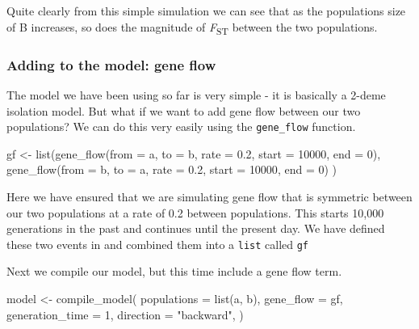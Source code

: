 \documentclass[
  letterpaper,
  DIV=11,
  numbers=noendperiod]{scrartcl}
\newenvironment{Shaded}{\begin{snugshade}}{\end{snugshade}}
\newcommand{\AttributeTok}[1]{\textcolor[rgb]{0.40,0.45,0.13}{#1}}
\newcommand{\DecValTok}[1]{\textcolor[rgb]{0.68,0.00,0.00}{#1}}
\newcommand{\FloatTok}[1]{\textcolor[rgb]{0.68,0.00,0.00}{#1}}
\newcommand{\FunctionTok}[1]{\textcolor[rgb]{0.28,0.35,0.67}{#1}}
\newcommand{\NormalTok}[1]{\textcolor[rgb]{0.00,0.23,0.31}{#1}}
\newcommand{\OtherTok}[1]{\textcolor[rgb]{0.00,0.23,0.31}{#1}}
\newcommand{\StringTok}[1]{\textcolor[rgb]{0.13,0.47,0.30}{#1}}
\begin{document}
Quite clearly from this simple simulation we can see that as the
populations size of B increases, so does the magnitude of
\emph{F}\textsubscript{ST} between the two populations.

\hypertarget{adding-to-the-model-gene-flow}{%
\subsubsection{Adding to the model: gene
flow}\label{adding-to-the-model-gene-flow}}

The model we have been using so far is very simple - it is basically a
2-deme isolation model. But what if we want to add gene flow between our
two populations? We can do this very easily using the
\texttt{gene\_flow} function.

\begin{Shaded}
\begin{Highlighting}[]
\NormalTok{gf }\OtherTok{\textless{}{-}}
  \FunctionTok{list}\NormalTok{(}\FunctionTok{gene\_flow}\NormalTok{(}\AttributeTok{from =}\NormalTok{ a, }\AttributeTok{to =}\NormalTok{ b, }\AttributeTok{rate =} \FloatTok{0.2}\NormalTok{, }\AttributeTok{start =} \DecValTok{10000}\NormalTok{, }\AttributeTok{end =} \DecValTok{0}\NormalTok{),}
       \FunctionTok{gene\_flow}\NormalTok{(}\AttributeTok{from =}\NormalTok{ b, }\AttributeTok{to =}\NormalTok{ a, }\AttributeTok{rate =} \FloatTok{0.2}\NormalTok{, }\AttributeTok{start =} \DecValTok{10000}\NormalTok{, }\AttributeTok{end =} \DecValTok{0}\NormalTok{)}
\NormalTok{  )}
\end{Highlighting}
\end{Shaded}

Here we have ensured that we are simulating gene flow that is symmetric
between our two populations at a rate of 0.2 between populations. This
starts 10,000 generations in the past and continues until the present
day. We have defined these two events in and combined them into a
\texttt{list} called \texttt{gf}

Next we compile our model, but this time include a gene flow term.

\begin{Shaded}
\begin{Highlighting}[]
\NormalTok{model }\OtherTok{\textless{}{-}} \FunctionTok{compile\_model}\NormalTok{(}
  \AttributeTok{populations =} \FunctionTok{list}\NormalTok{(a, b),}
  \AttributeTok{gene\_flow =}\NormalTok{ gf,}
  \AttributeTok{generation\_time =} \DecValTok{1}\NormalTok{,}
  \AttributeTok{direction =} \StringTok{"backward"}\NormalTok{,}
\NormalTok{)}
\end{Highlighting}
\end{Shaded}
\end{document}
